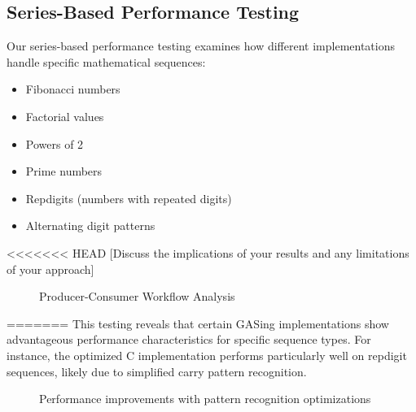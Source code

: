 \subsection{Series-Based Performance Testing}

Our series-based performance testing examines how different implementations handle specific mathematical sequences:

\begin{itemize}
    \item Fibonacci numbers
    \item Factorial values
    \item Powers of 2
    \item Prime numbers
    \item Repdigits (numbers with repeated digits)
    \item Alternating digit patterns
\end{itemize}

<<<<<<< HEAD
[Discuss the implications of your results and any limitations of your approach]

\begin{figure}[htbp]
\centering
\resizebox{0.9\columnwidth}{!}{}
\caption{Producer-Consumer Workflow Analysis}
\label{fig:producer_consumer_results}
\end{figure}
=======
This testing reveals that certain GASing implementations show advantageous performance characteristics for specific sequence types. For instance, the optimized C implementation performs particularly well on repdigit sequences, likely due to simplified carry pattern recognition.

\begin{figure}[h]
    \centering
    \caption{Performance improvements with pattern recognition optimizations}
    \label{fig:pattern_speedups}
\end{figure}

